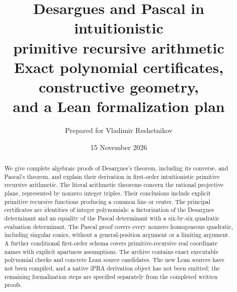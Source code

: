 \documentclass[11pt]{article}
\title{\color{ink}\textbf{Desargues and Pascal in intuitionistic\\
primitive recursive arithmetic}\\[0.5em]
\large Exact polynomial certificates, constructive geometry,\\
and a Lean formalization plan}
\author{Prepared for Vladimir Reshetnikov}
\date{15 November 2026}
\theoremstyle{definition}
\theoremstyle{remark}
\begin{document}
\maketitle
\begin{abstract}
We give complete algebraic proofs of Desargues's theorem, including its
converse, and Pascal's theorem, and explain their derivation in first-order
intuitionistic primitive recursive arithmetic. The literal arithmetic
theorems concern the rational projective plane, represented by nonzero
integer triples. Their conclusions include explicit primitive recursive
functions producing a common line or center. The principal certificates
are identities of integer polynomials: a factorization of the Desargues
determinant and an equality of the Pascal determinant with a six-by-six
quadratic evaluation determinant. The Pascal proof covers every nonzero
homogeneous quadratic, including singular conics, without a
general-position argument or a limiting argument. A further conditional
first-order schema covers primitive-recursive real coordinate names with
explicit apartness assumptions. The archive contains exact executable
polynomial checks and concrete Lean source candidates. The new Lean
sources have not been compiled, and a native iPRA derivation object has
not been emitted; the remaining formalization steps are specified
separately from the completed written proofs.
\end{abstract}
\clearpage
{\small\tableofcontents}
\newpage








\end{document}
